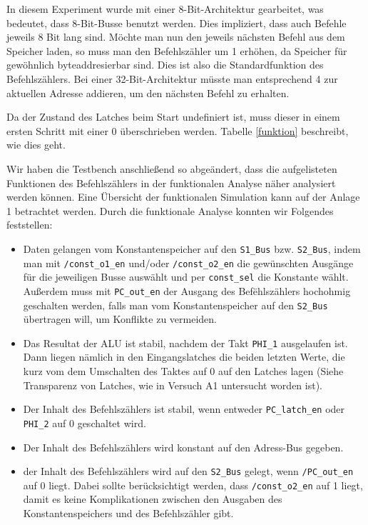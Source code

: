 \documentclass[12pt,a4paper]{scrartcl}
\begin{document}
In diesem Experiment wurde mit einer 8-Bit-Architektur gearbeitet, was bedeutet, dass 8-Bit-Busse benutzt werden.
Dies impliziert, dass auch Befehle jeweils 8 Bit lang sind.
M\"ochte man nun den jeweils n\"achsten Befehl aus dem Speicher laden, so muss man den Befehlsz\"ahler um 1 erh\"ohen, da Speicher f\"ur gew\"ohnlich byteaddresierbar sind.
Dies ist also die Standardfunktion des Befehlsz\"ahlers.
Bei einer 32-Bit-Architektur m\"usste man entsprechend 4 zur aktuellen Adresse addieren, um den n\"achsten Befehl zu erhalten.

Da der Zustand des Latches beim Start undefiniert ist, muss dieser in einem ersten Schritt mit einer 0 \"uberschrieben werden.
Tabelle \ref{funktion} beschreibt, wie dies geht.

Wir haben die Testbench anschlie\ss end so abge\"andert, dass die aufgelisteten Funktionen des Befehlsz\"ahlers in der funktionalen Analyse n\"aher analysiert werden k\"onnen.
Eine \"Ubersicht der funktionalen Simulation kann auf der Anlage 1 betrachtet werden.
Durch die funktionale Analyse konnten wir Folgendes feststellen:

\begin{itemize}
  \item Daten gelangen vom Konstantenspeicher auf den \texttt{S1\_Bus} bzw. \texttt{S2\_Bus}, indem man mit \texttt{/const\_o1\_en} und/oder \texttt{/const\_o2\_en} die gew\"unschten Ausg\"ange f\"ur die jeweiligen Busse ausw\"ahlt und per \texttt{const\_sel} die Konstante w\"ahlt. Au\ss erdem muss mit \texttt{PC\_out\_en} der Ausgang des Bef\"ehlsz\"ahlers hochohmig geschalten werden, falls man vom Konstantenspeicher auf den \texttt{S2\_Bus} \"ubertragen will, um Konflikte zu vermeiden.
  \item Das Resultat der ALU ist stabil, nachdem der Takt \texttt{PHI\_1} ausgelaufen ist. Dann liegen n\"amlich in den Eingangslatches die beiden letzten Werte, die kurz vom dem Umschalten des Taktes auf 0 auf den Latches lagen (Siehe Transparenz von Latches, wie in Versuch A1 untersucht worden ist).
  \item Der Inhalt des Befehlsz\"ahlers ist stabil, wenn entweder \texttt{PC\_latch\_en} oder \texttt{PHI\_2} auf 0 geschaltet wird.
  \item Der Inhalt des Befehlsz\"ahlers wird konstant auf den Adress-Bus gegeben.
  \item der Inhalt des Befehlsz\"ahlers wird auf den \texttt{S2\_Bus} gelegt, wenn \texttt{/PC\_out\_en} auf 0 liegt. Dabei sollte ber\"ucksichtigt werden, dass \texttt{/const\_o2\_en} auf 1 liegt, damit es keine Komplikationen zwischen den Ausgaben des Konstantenspeichers und des Befehlsz\"ahler gibt.
\end{itemize}
\end{document}
